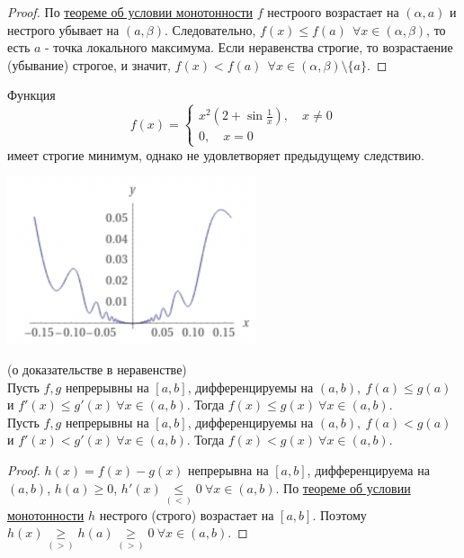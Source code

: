 \begin{proof}
    По \hyperlink{th10}{теореме об условии монотонности} $f$ нестроого возрастает на $(\alpha, a)$ и нестрого убывает на $(a, \beta)$. Следовательно, $f(x) \leq f(a) \ \ \forall x \in (\alpha, \beta)$, то есть $a$ - точка локального максимума.
    Если неравенства строгие, то возрастаение (убывание) строгое, и значит, $f(x) < f(a) \ \ \forall x \in (\alpha, \beta) \setminus \{a\}$.
\end{proof}

\begin{note}
    Функция \[f(x) = \begin{cases}
        x^2(2 + \sin \frac{1}{x}), \quad x \neq 0 \\
        0, \quad x = 0
    \end{cases}\]
    имеет строгие минимум, однако не удовлетворяет предыдущему следствию.\\
    \begin{center}
        \includegraphics[width=0.55\textwidth]{x2_na_sin_1_div_x.png}
    \end{center}
\end{note}

\begin{corollary}
    (о доказательстве в неравенстве)\\
    Пусть $f, g$ непрерывны на $[a, b]$, дифференцируемы на $(a, b), \ f(a) \leq g(a)$ и $f'(x) \leq g'(x) \ \forall x \in (a, b)$.
    Тогда $f(x) \leq g(x) \ \forall x \in (a, b)$.\\
    Пусть $f, g$ непрерывны на $[a, b]$, дифференцируемы на $(a, b), \ f(a) < g(a)$ и $f'(x) < g'(x) \ \forall x \in (a, b)$.
    Тогда $f(x) < g(x) \ \forall x \in (a, b)$. 
\end{corollary}

\begin{proof}
    $h(x) = f(x) - g(x)$ непрерывна на $[a, b]$, дифференцируема на $(a, b)$, $h(a) \geq 0$, $h'(x) \underset{(<)}{\leq} 0 \ \forall x \in (a, b)$.
    По \hyperlink{th10}{теореме об условии монотонности} $h$ нестрого (строго) возрастает на $[a, b]$. 
    Поэтому $h(x) \underset{(>)}{\geq} h(a) \underset{(>)}{\geq} 0 \ \forall x \in (a, b)$.
\end{proof}


